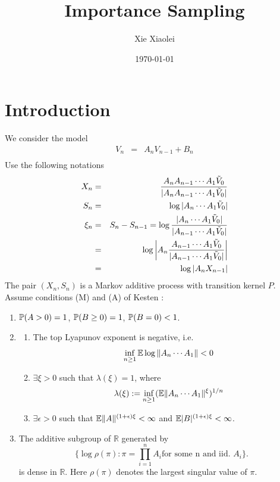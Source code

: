 \documentclass{article}
\title{Importance Sampling}
\author{Xie Xiaolei}
\date{\today}
\theoremstyle{remark}
\begin{document}
\maketitle
\section{Introduction}
We consider the model
\begin{eqnarray*}
V_n &=& A_n V_{n-1} + B_n\\
\end{eqnarray*}
Use the following notations
\begin{eqnarray*}
X_n &=& {
        A_n A_{n-1} \cdots A_1 \tilde V_0
        \over
        |A_n A_{n-1} \cdots A_1 \tilde V_0|
        } \\
S_n &=& \log |A_n \cdots A_1 \tilde V_0| \\
\xi_n &=& S_n - S_{n-1} = \log\frac{|A_n \cdots A_1 \tilde V_0|}{|A_{n-1}
  \cdots A_1 \tilde V_0|} \\
&=& \log\left| A_n \frac{A_{n-1} \cdots A_1 \tilde V_0}
    {|A_{n-1} \cdots A_1 \tilde V_0|} \right|\\
&=& \log |A_n X_{n-1}|
\end{eqnarray*}
The pair $(X_n, S_n)$ is a Markov additive process with transition
kernel $P$. Assume conditions (M) and (A) of Kesten \cite{Kesten1973}:
\begin{enumerate}
  \item $\P(A > 0) = 1$, $\P(B \geq 0) = 1$, $\P(B = 0) < 1$.
   
\item
  \begin{enumerate}
  \item The top Lyapunov exponent is negative, i.e.
    \begin{equation}
      \label{eq:neg_top_Lyapunov}
      \inf_{n \geq 1} \E \log \|A_n \cdots A_1\| < 0    
    \end{equation}
  \item $\exists \xi > 0$ such that $\lambda(\xi) = 1$, where
    $$
    \lambda(\xi) := \inf_{n \geq 1} (\E \|A_n \cdots A_1\|^\xi)^{1/n}
    $$
    \item $\exists \epsilon > 0$ such that $\E \|A\|^{(1 + \epsilon)\xi} <
      \infty$ and $\E |B|^{(1 + \epsilon)\xi} < \infty$.
  \end{enumerate}
  \item The additive subgroup of $\mathbb R$ generated by
    \[
    \{\log \rho(\pi): \pi = \prod_{i=1}^n A_i \text{for some n and
      iid. } A_i\}.
    \]
    is dense in $\mathbb R$. Here $\rho(\pi)$ denotes the largest
    singular value of $\pi$.
\end{enumerate}
\end{document}
